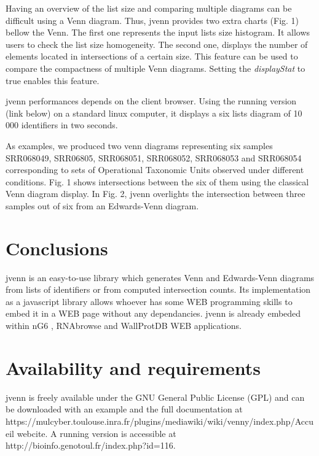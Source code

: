 \documentclass{bmcart}
\begin{document}
Having an overview of the list size and comparing multiple diagrams can be difficult using a Venn diagram. Thus, jvenn provides two extra charts (Fig. 1) 
bellow the Venn. The first one represents the input lists size histogram. It allows users to check the list size homogeneity. The second one, displays 
the number of elements located in intersections of a certain size. This feature can be used to compare the compactness of multiple Venn diagrams. 
Setting the \textit{displayStat} to true enables this feature.

jvenn performances depends on the client browser. Using the running version (link below) on a standard linux computer, it displays a six lists diagram of 
10 000 identifiers in two seconds.

As examples, we produced two venn diagrams representing six samples SRR068049, SRR06805, SRR068051, SRR068052, SRR068053 and 
SRR068054 corresponding to sets of Operational Taxonomic Units observed under different conditions. Fig. 1 shows intersections
between the six of them using the classical Venn diagram display. In Fig. 2, jvenn overlights the intersection between three samples out of 
six from an Edwards-Venn diagram.


\section*{Conclusions}

jvenn is an easy-to-use library which generates Venn and Edwards-Venn diagrams from lists of identifiers or from
computed intersection counts. Its implementation as a javascript library allows whoever has some WEB programming skills to embed it 
in a WEB page without any dependancies. jvenn is already embeded within nG6 \cite{Mariette2012}, RNAbrowse \cite{Mariette} and 
WallProtDB \cite{SanClemente} WEB applications.

\section*{Availability and requirements}

jvenn is freely available under the GNU General Public License (GPL) and can be downloaded with an example and the full documentation
at https://mulcyber.toulouse.inra.fr/plugins/mediawiki/wiki/venny/index.php/Accueil webcite. A running version is accessible at 
http://bioinfo.genotoul.fr/index.php?id=116.

\end{document}
